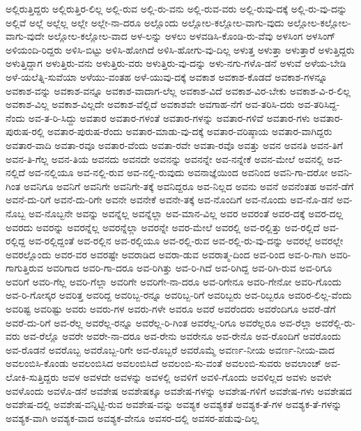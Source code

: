 {ಅಲ್ಲಿರುತ್ತಿದ್ದರು
ಅಲ್ಲಿರುತ್ತಿರ-ಲಿಲ್ಲ
ಅಲ್ಲಿ-ರುವ
ಅಲ್ಲಿ-ರು-ವನು
ಅಲ್ಲಿ-ರುವ-ವರು
ಅಲ್ಲಿ-ರುವು-ದಕ್ಕೆ
ಅಲ್ಲಿ-ರು-ವು-ದನ್ನು
ಅಲ್ಲಿವೆ
ಅಲ್ಲೆ
ಅಲ್ಲೆಲ್ಲ
ಅಲ್ಲೇ
ಅಲ್ಲೇ-ನಾ-ದರೂ
ಅಲ್ಲೊಂದು
ಅಲ್ಲೋಲ-ಕಲ್ಲೋಲ-ವಾಗು-ವುದು
ಅಲ್ಲೋಲ-ಕಲ್ಲೋಲ-ವಾಗು-ವುದೇ
ಅಲ್ಲೋಲ-ಕಲ್ಲೋಲ-ವಾದ
ಅಳ-ಲನ್ನು
ಅಳಲು
ಅಳವಡಿಸಿ-ಕೊಂಡಿ-ರು-ವೆವು
ಅಳಸಿಂಗ
ಅಳಸಿಂಗ್
ಅಳಿಯಂದಿ-ರಿದ್ದರು
ಅಳಿಸಿ-ಬಿಟ್ಟು
ಅಳಿಸಿ-ಹೋಗಿದೆ
ಅಳಿಸಿ-ಹೋಗು-ವು-ದಿಲ್ಲ
ಅಳುತ್ತ
ಅಳುತ್ತಾ
ಅಳುತ್ತಾರೆ
ಅಳುತ್ತಿದ್ದರು
ಅಳುತ್ತಿದ್ದಾಗ
ಅಳುತ್ತಿರು-ವನು
ಅಳುತ್ತಿರು-ವರು
ಅಳುತ್ತಿರು-ವು-ದನ್ನು
ಅಳು-ನಗು-ಗಳೊ-ಡನೆ
ಅಳುವೆ
ಅಳೆಯ-ಬೇಡಿ
ಅಳೆ-ಯಲೆತ್ನಿ-ಸುವೆಯಾ
ಅಳೆಯು-ವಂತಹ
ಅಳೆ-ಯುವು-ದಕ್ಕೆ
ಅವಕಾಶ
ಅವಕಾಶ-ಕೊಡದೆ
ಅವಕಾಶ-ಗಳನ್ನೂ
ಅವಕಾಶ-ವನ್ನು
ಅವಕಾಶ-ವನ್ನೂ
ಅವಕಾಶ-ವಾದಾಗ-ಲೆಲ್ಲ
ಅವಕಾಶ-ವಿದೆ
ಅವಕಾಶ-ವಿರ-ಬೇಕು
ಅವಕಾಶ-ವಿ-ರ-ಲಿಲ್ಲ
ಅವಕಾಶ-ವಿಲ್ಲ
ಅವಕಾಶ-ವಿಲ್ಲದೇ
ಅವಕಾಶ-ವೆಲ್ಲಿದೆ
ಅವಕಾಶವೇ
ಅವಗಾಹ-ನೆಗೆ
ಅವ-ತರಿಸಿ-ದರು
ಅವ-ತರಿಸಿದ್ದ-ನೆಂದು
ಅವ-ತ-ರಿ-ಸಿದ್ದು
ಅವತಾರ
ಅವತಾರ-ಗಳಂತೆ
ಅವತಾರ-ಗಳನ್ನು
ಅವತಾರ-ಗಳಿವೆ
ಅವತಾರ-ಗಳು
ಅವತಾರ-ಪುರುಷ-ರಲ್ಲಿ
ಅವತಾರ-ಪುರುಷ-ರೆಂದು
ಅವತಾರ-ಮಾಡು-ವು-ದಕ್ಕೆ
ಅವತಾರ-ವರಿಷ್ಠಾಯ
ಅವತಾರ-ವಾಗಿದ್ದರು
ಅವತಾರ-ವಾದಿ
ಅವತಾ-ರವೂ
ಅವತಾರ-ವೆಂದು
ಅವತಾ-ರವೇ
ಅವತಾ-ರವೊ
ಅವತ್ತು
ಅವನ
ಅವನತಿ
ಅವನ-ತಿಗೆ
ಅವನ-ತಿ-ಗೆಲ್ಲ
ಅವನ-ತಿಯ
ಅವನದು
ಅವನದೇ
ಅವನನ್ನು
ಅವನನ್ನೇ
ಅವ-ನನ್ನೇಕೆ
ಅವನ-ಮೇಲೆ
ಅವನಲ್ಲಿ
ಅವ-ನಲ್ಲಿದೆ
ಅವ-ನಲ್ಲಿಯೂ
ಅವ-ನಲ್ಲಿ-ರುವ
ಅವ-ನಲ್ಲಿ-ರುವುದು
ಅವನಾಜ್ಞೆಯಿಂದ
ಅವನಿಂದ
ಅವನಿ-ಗಾ-ದರೋ
ಅವನಿ-ಗಿಂತ
ಅವನಿಗೂ
ಅವನಿಗೆ
ಅವನಿಗೇ
ಅವನಿಗೇ-ತಕ್ಕೆ
ಅವನಿದ್ದರೂ
ಅವ-ನಿಲ್ಲದ
ಅವನು
ಅವನೆ
ಅವನೆಂತಹ
ಅವನೆ-ಡೆಗೆ
ಅವನೆ-ದು-ರಿಗೆ
ಅವನೆ-ದು-ರಿಗೇ
ಅವನೇ
ಅವನೇಕೆ
ಅವನೇ-ತಕ್ಕೆ
ಅವ-ನೊಂದಿಗೆ
ಅವ-ನೊಂದು
ಅವ-ನೊ-ಡನೆ
ಅವ-ನೊಬ್ಬ
ಅವ-ನೊಬ್ಬನೇ
ಅವನ್ನು
ಅವನ್ನೆಲ್ಲ
ಅವನ್ನೆಲ್ಲಾ
ಅವ-ಮಾನ-ವಿಲ್ಲ
ಅವರ
ಅವರಂತೆ
ಅವರ-ದಕ್ಕೆ
ಅವರ-ದಲ್ಲ
ಅವರದು
ಅವರನ್ನು
ಅವರನ್ನೆಲ್ಲ
ಅವರನ್ನೆಲ್ಲಾ
ಅವರನ್ನೇ
ಅವರ-ಮೇಲೆ
ಅವರಲ್ಲಿ
ಅವ-ರಲ್ಲಿತ್ತು
ಅವ-ರಲ್ಲಿದೆ
ಅವ-ರಲ್ಲಿದ್ದ
ಅವ-ರಲ್ಲಿದ್ದಂತೆ
ಅವ-ರಲ್ಲಿನ
ಅವ-ರಲ್ಲಿಯೂ
ಅವ-ರಲ್ಲಿ-ರುವ
ಅವ-ರಲ್ಲಿ-ರು-ವು-ದನ್ನು
ಅವರಲ್ಲೆ
ಅವರಲ್ಲೇ
ಅವರಲ್ಲೊಂದು
ಅವರ-ವರ
ಅವರಷ್ಟೇ
ಅವರಾಡಿದ
ಅವರಾ-ಡುವ
ಅವರಾತ್ಮ-ದಿಂದ
ಅವ-ರಿಂದ
ಅವ-ರಿ-ಗಾಗಿ
ಅವರಿ-ಗಾಗುತ್ತಿರುವ
ಅವರಿಗಾದ
ಅವರಿ-ಗಾ-ದರೂ
ಅವ-ರಿಗಿತ್ತು
ಅವ-ರಿ-ಗಿದೆ
ಅವ-ರಿಗಿದ್ದ
ಅವ-ರಿಗಿ-ರುವ
ಅವ-ರಿಗೂ
ಅವರಿಗೆ
ಅವರಿ-ಗೆಲ್ಲ
ಅವರಿ-ಗೆಲ್ಲಾ
ಅವರಿಗೇ
ಅವರಿಗೇ-ನಾ-ದರೂ
ಅವ-ರಿಗೇನೂ
ಅವರಿ-ಗೇನೋ
ಅವರಿ-ಗೊಂದು
ಅವ-ರಿ-ಗೋಸ್ಕರ
ಅವರಿತ್ತ
ಅವರಿದ್ದ
ಅವರಿಬ್ಬ-ರನ್ನೂ
ಅವರಿಬ್ಬ-ರಿಗೆ
ಅವರಿಬ್ಬರು
ಅವ-ರಿಬ್ಬರೂ
ಅವರಿರ-ಲಿಲ್ಲ-ವೆಂದು
ಅವರಿಷ್ಟ
ಅವರಿಷ್ಟು
ಅವರು
ಅವರು-ಗಳ
ಅವರು-ಗಳೇ
ಅವರೂ
ಅವರೆ
ಅವರೆಂದರು
ಅವರೆಂದಿಗೂ
ಅವರೆ-ಡೆಗೆ
ಅವರೆ-ದು-ರಿಗೆ
ಅವ-ರೆಲ್ಲ
ಅವರೆಲ್ಲ-ರನ್ನೂ
ಅವರೆಲ್ಲ-ರಿ-ಗಿಂತ
ಅವರೆಲ್ಲ-ರಿಗೂ
ಅವರೆಲ್ಲರೂ
ಅವ-ರೆಲ್ಲಾ
ಅವರೆಲ್ಲಿ-ರು-ವರು
ಅವ-ರೆಲ್ಲೊ
ಅವರೇ
ಅವರೇ-ನಾ-ದರೂ
ಅವ-ರೇನು
ಅವರೇನೂ
ಅವ-ರೇನೊ
ಅವ-ರೊಂದಿಗೆ
ಅವರೊಂದು
ಅವ-ರೊಡನೆ
ಅವರೊಬ್ಬ
ಅವರೊಬ್ಬ-ರಿಗೇ
ಅವ-ರೊಬ್ಬರೆ
ಅವರೊಮ್ಮೆ
ಅವರ್ಣ-ನೀಯ
ಅವರ್ಣ-ನೀಯ-ವಾದ
ಅವಲಂಬಿಸಿ-ಕೊಂಡು
ಅವಲಂಬಿಸಿದ
ಅವಲಂಬಿಸಿದೆ
ಅವಲಂಬಿ-ಸು-ವಂತೆ
ಅವಲಂಬಿ-ಸುವರು
ಅವಲಾಂಚ್
ಅವ-ಲೋಕಿ-ಸುತ್ತಿದ್ದರು
ಅವಳ
ಅವಳದೇ
ಅವಳನ್ನು
ಅವಳಲ್ಲಿ
ಅವಳಿಗೆ
ಅವಳಿ-ಗೊಂದು
ಅವಳಿಲ್ಲದ
ಅವಳು
ಅವಳೇ
ಅವಳೊಂದು
ಅವಳೊ-ಡನೆ
ಅವಶೇಷ
ಅವಶೇಷಕ್ಕೂ
ಅವಶೇಷ-ಗಳನ್ನು
ಅವಶೇಷ-ಗಳಿಗೆ
ಅವಶೇಷ-ಗಳು
ಅವಶೇಷದ
ಅವಶೇಷ-ದಲ್ಲಿ
ಅವಶೇಷ-ವನ್ನಿಟ್ಟಿ-ರುವ
ಅವಶೇಷ-ವನ್ನು
ಅವಶ್ಯಕ
ಅವಶ್ಯಕತೆ
ಅವಶ್ಯಕ-ತೆ-ಗಳ
ಅವಶ್ಯಕ-ತೆ-ಗಳನ್ನು
ಅವಶ್ಯಕ-ವಾಗಿ
ಅವಶ್ಯಕ-ವಾದ
ಅವಶ್ಯಕ-ವೇನೂ
ಅವಸರ-ದಲ್ಲಿ
ಅವಸರ-ಪಡುವು-ದಿಲ್ಲ
}
